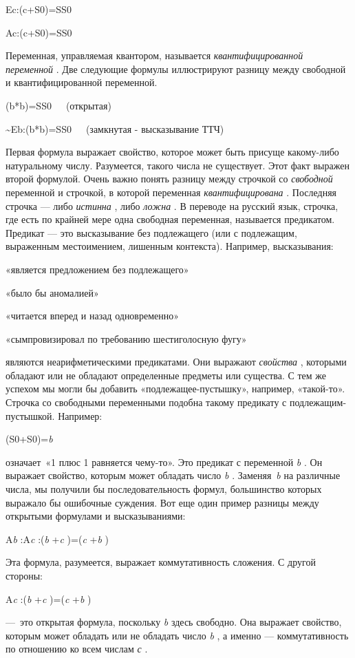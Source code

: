 \documentclass[../main.tex]{subfiles}
\begin{document}
Ec:(c+S0)=SS0

Ac:(c+S0)=SS0

Переменная, управляемая квантором, называется \emph{квантифицированной переменной} . Две следующие формулы иллюстрируют разницу между свободной и квантифицированной переменной.

(b*b)=SS0~~~(открытая)

\textasciitilde Eb:(b*b)=SS0~~~(замкнутая - высказывание ТТЧ)

Первая формула выражает свойство, которое может быть присуще какому-либо натуральному числу. Разумеется, такого числа не существует. Этот факт выражен второй формулой. Очень важно понять разницу между строчкой со \emph{свободной} переменной и строчкой, в которой переменная \emph{квантифицирована} . Последняя строчка --- либо \emph{истинна} , либо \emph{ложна} . В переводе на русский язык, строчка, где есть по крайней мере одна свободная переменная, называется предикатом. Предикат --- это высказывание без подлежащего (или с подлежащим, выраженным местоимением, лишенным контекста). Например, высказывания:

«является предложением без подлежащего»

«было бы аномалией»

«читается вперед и назад одновременно»

«сымпровизировал по требованию шестиголосную фугу»

являются неарифметическими предикатами. Они выражают \emph{свойства} , которыми обладают или не обладают определенные предметы или существа. С тем же успехом мы могли бы добавить «подлежащее-пустышку», например, «такой-то». Строчка со свободными переменными подобна такому предикату с подлежащим-пустышкой. Например:

(S0+S0)=\emph{b}

означает~«1 плюс 1 равняется чему-то». Это предикат с переменной \emph{b} . Он выражает свойство, которым может обладать число \emph{b} . Заменяя~\emph{b} на различные числа, мы получили бы последовательность формул, большинство которых выражало бы ошибочные суждения. Вот еще один пример разницы между открытыми формулами и высказываниями:

A\emph{b} :A\emph{c} :(\emph{b} +\emph{c} )=(\emph{c} +\emph{b} )

Эта формула, разумеется, выражает коммутативность сложения. С другой стороны:

A\emph{c} :(\emph{b} +\emph{c} )=(\emph{c} +\emph{b} )

---~это открытая формула, поскольку \emph{b} здесь свободно. Она выражает свойство, которым может обладать или не обладать число \emph{b} , а именно --- коммутативность по отношению ко всем числам \emph{с} .
\end{document}
